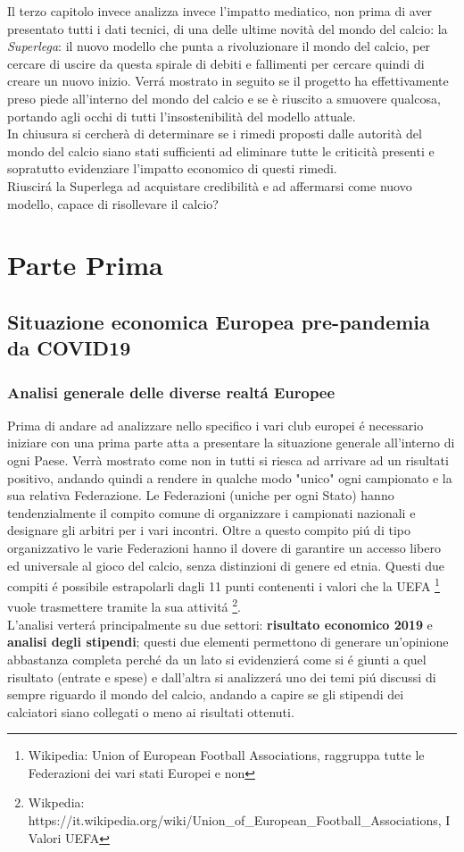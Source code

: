 \documentclass[
    corpo=12pt,
    oneside,
    evenboxes,
    tipotesi=triennale,
    stile=classica,
    oldstyle,
    autoretitolo,
    greek,
]{toptesi}
\begin{document}
\begin{interlinea}{1.5}
Il terzo capitolo invece analizza invece l'impatto mediatico, non prima di aver presentato tutti i dati tecnici, di una delle ultime novità 
del mondo del calcio: la \emph{Superlega}: il nuovo modello che punta a rivoluzionare il mondo del calcio, per cercare di uscire da questa spirale di debiti
e fallimenti per cercare quindi di creare un nuovo inizio. Verr\'a mostrato in seguito se il progetto ha effettivamente preso piede all'interno del mondo del calcio 
e se è riuscito a smuovere qualcosa, portando agli occhi di tutti l'insostenibilità del modello attuale.\\
In chiusura si cercherà di determinare se i rimedi proposti dalle autorità del mondo del calcio siano stati sufficienti ad eliminare tutte le criticità presenti e 
sopratutto evidenziare l'impatto economico di questi rimedi.\\
Riuscir\'a la Superlega ad acquistare credibilità e ad affermarsi come nuovo modello, capace di risollevare il calcio?

\part{Parte Prima}
\chapter{Situazione economica Europea pre-pandemia da COVID19}
\section{Analisi generale delle diverse realt\'a Europee}
Prima di andare ad analizzare nello specifico i vari club europei \'e necessario iniziare con una prima 
parte atta a presentare la situazione generale all'interno di ogni Paese. Verrà mostrato come non in tutti 
si riesca ad arrivare ad un risultati positivo, andando quindi a rendere in qualche modo 
"unico" ogni campionato e la sua relativa Federazione. Le Federazioni (uniche per ogni Stato) hanno tendenzialmente il compito
comune di organizzare i campionati nazionali e designare gli arbitri per i vari incontri. Oltre a questo compito pi\'u di tipo
organizzativo le varie Federazioni hanno il dovere di garantire un accesso libero ed universale al gioco del calcio, senza distinzioni
di genere ed etnia. Questi due compiti \'e possibile estrapolarli dagli 11 punti contenenti i valori che la UEFA 
\footnote{Wikipedia: Union of European Football Associations, raggruppa tutte le Federazioni dei vari stati Europei e non} vuole
trasmettere tramite la sua attivit\'a \footnote{Wikpedia: https://it.wikipedia.org/wiki/Union\_of\_European\_Football\_Associations, I Valori UEFA}.\\
L'analisi verter\'a principalmente su due settori: \textbf{risultato economico 2019} e \textbf{analisi degli stipendi}; questi due elementi
permettono di generare un'opinione abbastanza completa perch\'e da un lato si evidenzier\'a come si \'e giunti a quel risultato (entrate e spese)
e dall'altra si analizzer\'a uno dei temi pi\'u discussi di sempre riguardo il mondo del calcio, andando a capire se gli stipendi dei calciatori
siano collegati o meno ai risultati ottenuti.


\end{interlinea}
\end{document}
